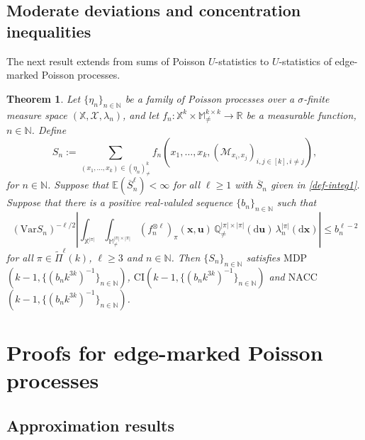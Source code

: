 \documentclass{article}
\newtheorem{theorem}{Theorem}[section]
\theoremstyle{definition}
\numberwithin{equation}{section}
\theoremstyle{remark}
\newcommand{\E}{\mathbb{E}}
\newcommand{\Var}{\mathrm{Var}}
\begin{document}
\fi

\subsection{Moderate deviations and concentration inequalities}
The next result extends \cite[Theorem~3.2]{schulte2} from sums of Poisson $U$-statistics to $U$-statistics of edge-marked Poisson processes. 

\begin{theorem}\label{thm:MDP}
	Let $\{\eta_n\}_{n\in\mathbb{N}}$ be a family of Poisson processes over a  $\sigma$-finite measure space $(\mathbb{X},\mathcal{X},\lambda_n)$, and let $f_n: \mathbb{X}^k\times \mathbb{M}^{k\times k}_{\neq}\to\mathbb{R}$ be a measurable function, $n\in\mathbb{N}$.
Define 
$$S_n:=\sum_{(x_1,\ldots,x_k)\in(\eta_n)^k_{\neq}} f_n(x_1,\ldots,x_k, (\mathcal{M}_{x_i,x_j})_{i,j\in[k], i\neq j}),$$
for $n\in\mathbb{N}$.
Suppose that $\E\left(\overline{S}_n^\ell\right)<\infty$ for all $\ell\ge1$ with $\overline{S}_n$ given in \eqref{def-integ1}. Suppose that there is a positive real-valuled sequence $\{b_n\}_{n\in\mathbb{N}}$ such that
\begin{equation}
	(\Var S_n)^{-\ell/2}\left|\int_{\mathbb{X}^{|\pi|}}\int_{\mathbb{M}^{|\pi|\times|\pi|}_{\ne}}(f_n^{\otimes\ell})_{\pi}(\bm{x},\bm{u}) \, \mathbb{Q}^{|\pi|\times|\pi|}_{\ne}(\mathrm{d}\bm{u}) \, \lambda_n^{|\pi|}(\mathrm{d}\bm{x})\right|\le b_n^{\ell-2}
\end{equation}
for all $\pi\in\widetilde{\Pi}^\ell(k)$, $\ell\ge3$ and $n\in\mathbb{N}$. Then $\{S_n\}_{n\in\mathbb{N}}$ satisfies 
\textbf{$\mathrm{MDP}$}$(k-1,\{(b_nk^{3k})^{-1}\}_{n\in\mathbb{N}})$, 
\textbf{$\mathrm{CI}$}$(k-1, \{(b_nk^{3k})^{-1}\}_{n \in \mathbb{N}})$ and \textbf{$\mathrm{NACC}$}$(k-1,\{(b_nk^{3k})^{-1}\}_{n\in\mathbb{N}})$. 
\end{theorem}


\section{Proofs for edge-marked Poisson processes}\label{Sec:pfedge}
\subsection{Approximation results}\label{sec:approximation}
\end{document}
